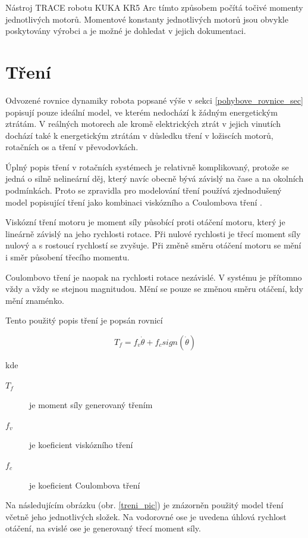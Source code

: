 Nástroj TRACE robotu KUKA KR5 Arc tímto způsobem počítá točivé momenty jednotlivých motorů. Momentové konstanty jednotlivých motorů jsou obvykle poskytovány výrobci a je možné je dohledat v jejich dokumentaci. 

\section{Tření}

Odvozené rovnice dynamiky robota popsané výše v sekci \ref{pohybove_rovnice_sec} popisují pouze ideální model, ve kterém nedochází k žádným energetickým ztrátám. V reálných motorech ale kromě elektrických ztrát v jejich vinutích dochází také k energetickým ztrátám v důsledku tření v ložiscích motorů, rotačních os a tření v převodovkách.

Úplný popis tření v rotačních systémech je relativně komplikovaný, protože se jedná o silně nelineární děj, který navíc obecně bývá závislý na čase a na okolních podmínkách. Proto se zpravidla pro modelování tření používá zjednodušený model popisující tření jako kombinaci viskózního a Coulombova tření \cite{fric_eff_analysis}. 

Viskózní tření motoru je moment síly působící proti otáčení motoru, který je lineárně závislý na jeho rychlosti rotace. Při nulové rychlosti je třecí moment síly nulový a s rostoucí rychlostí se zvyšuje. Při změně směru otáčení motoru se mění i směr působení třecího momentu. 

Coulombovo tření je naopak na rychlosti rotace nezávislé. V systému je přítomno vždy a vždy se stejnou magnitudou. Mění se pouze se změnou směru otáčení, kdy mění znaménko.

Tento použitý popis tření je popsán rovnicí 

\begin{equation}
T_f = f_v\dot{\theta} + f_csign(\dot{\theta})
\label{fric_eq}
\end{equation}

kde

\begin{description}
\item[$T_f$] je moment síly generovaný třením 
\item[$f_v$] je koeficient viskózního tření 
\item[$f_c$] je koeficient Coulombova tření 
\end{description}

Na následujícím obrázku (obr. \ref{treni_pic}) je znázorněn použitý model tření včetně jeho jednotlivých složek. Na vodorovné ose je uvedena úhlová rychlost otáčení, na svislé ose je generovaný třecí moment síly.

